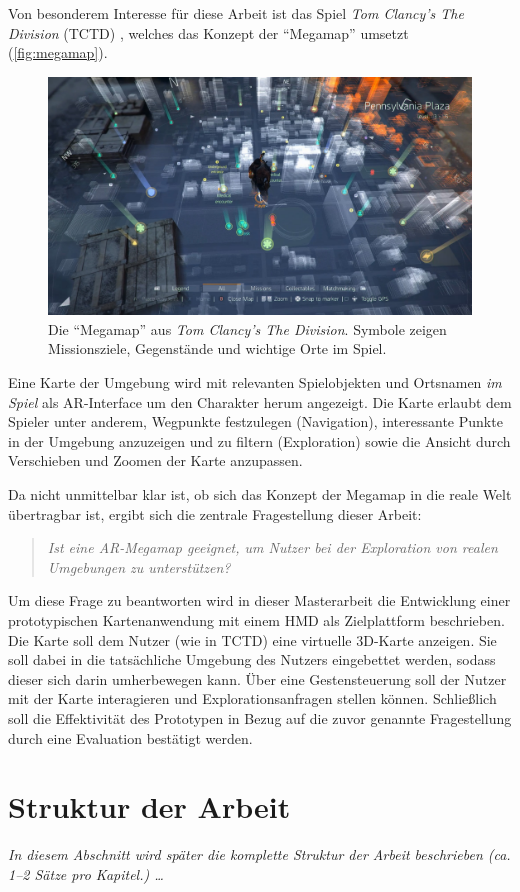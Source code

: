 Von besonderem Interesse für diese Arbeit ist das Spiel \emph{Tom Clancy's The Division} (TCTD) \parencite{Ubisoft2018}, welches das Konzept der \enquote{Megamap} umsetzt (\autoref{fig:megamap}).
\begin{figure}[h]
	\centering
	\includegraphics[width=\textwidth]{figures/the_division_megamap.jpg}
	\caption{Die \enquote{Megamap} aus \emph{Tom Clancy's The Division}. Symbole zeigen Missionsziele, Gegenstände und wichtige Orte im Spiel. }
	\label{fig:megamap}
\end{figure}
Eine Karte der Umgebung wird mit relevanten Spielobjekten und Ortsnamen \emph{im Spiel} als AR-Interface um den Charakter herum angezeigt.
Die Karte erlaubt dem Spieler unter anderem, Wegpunkte festzulegen (Navigation), interessante Punkte in der Umgebung anzuzeigen und zu filtern (Exploration) sowie die Ansicht durch Verschieben und Zoomen der Karte anzupassen.

Da nicht unmittelbar klar ist, ob sich das Konzept der Megamap in die reale Welt übertragbar ist, ergibt sich die zentrale Fragestellung dieser Arbeit:
\begin{quote}
\itshape
Ist eine AR-Megamap geeignet, um Nutzer bei der Exploration von \emph{realen} Umgebungen zu unterstützen?
\end{quote}
Um diese Frage zu beantworten wird in dieser Masterarbeit die Entwicklung einer prototypischen Kartenanwendung mit einem HMD als Zielplattform beschrieben.
Die Karte soll dem Nutzer (wie in TCTD) eine virtuelle 3D-Karte anzeigen.
Sie soll dabei in die tatsächliche Umgebung des Nutzers eingebettet werden, sodass dieser sich darin umherbewegen kann.
Über eine Gestensteuerung soll der Nutzer mit der Karte interagieren und Explorationsanfragen stellen können.
Schließlich soll die Effektivität des Prototypen in Bezug auf die zuvor genannte Fragestellung durch eine Evaluation bestätigt werden.

\section{Struktur der Arbeit}
\label{sec:struktur}
{\itshape In diesem Abschnitt wird später die komplette Struktur der Arbeit beschrieben (ca. 1--2 Sätze pro Kapitel.) \dots}

%
\cleardoublepage